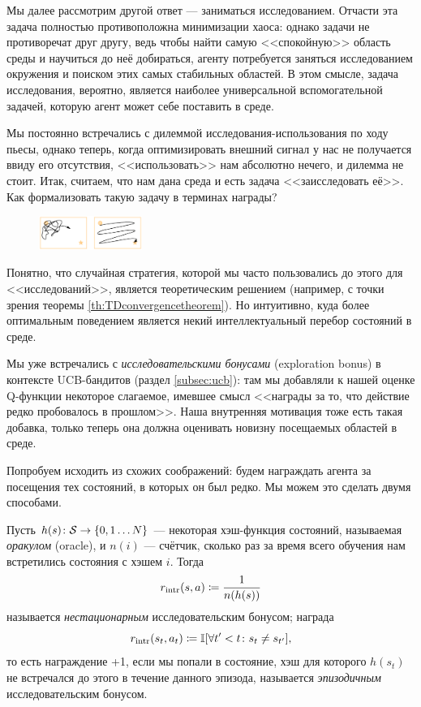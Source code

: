 Мы далее рассмотрим другой ответ --- заниматься исследованием. Отчасти эта задача полностью противоположна минимизации хаоса: однако задачи не противоречат друг другу, ведь чтобы найти самую <<спокойную>> область среды и научиться до неё добираться, агенту потребуется заняться исследованием окружения и поиском этих самых стабильных областей. В этом смысле, задача исследования, вероятно, является наиболее универсальной вспомогательной задачей, которую агент может себе поставить в среде.

Мы постоянно встречались с дилеммой исследования-использования по ходу пьесы, однако теперь, когда оптимизировать внешний сигнал у нас не получается ввиду его отсутствия, <<использовать>> нам абсолютно нечего, и дилемма не стоит. Итак, считаем, что нам дана среда и есть задача <<заисследовать её>>. Как формализовать такую задачу в терминах награды?

\begin{figure}
\vspace{-0.4cm}
\centering
\includegraphics[width=0.3\textwidth]{Images/exploration.png}
\vspace{-0.5cm}
\end{figure}

Понятно, что случайная стратегия, которой мы часто пользовались до этого для <<исследований>>, является теоретическим решением (например, с точки зрения теоремы \ref{th:TDconvergencetheorem}). Но интуитивно, куда более оптимальным поведением является некий интеллектуальный перебор состояний в среде.

Мы уже встречались с \emph{исследовательскими бонусами} (exploration bonus) в контексте UCB-бандитов (раздел \ref{subsec:ucb}): там мы добавляли к нашей оценке Q-функции некоторое слагаемое, имевшее смысл <<награды за то, что действие редко пробовалось в прошлом>>. Наша внутренняя мотивация тоже есть такая добавка, только теперь она должна оценивать новизну посещаемых областей в среде.

Попробуем исходить из схожих соображений: будем награждать агента за посещения тех состояний, в которых он был редко. Мы можем это сделать двумя способами.

\begin{definition}
Пусть $h(s) \colon \mathcal{S} \to \{0, 1 \dots N\}$ --- некоторая хэш-функция состояний, называемая \emph{оракулом} (oracle), и $n(i)$ --- счётчик, сколько раз за время всего обучения нам встретились состояния с хэшем $i$. Тогда
$$r_{\mathrm{intr}}(s, a) \coloneqq \frac{1}{n(h(s))}$$
называется \emph{нестационарным} исследовательским бонусом; награда
$$r_{\mathrm{intr}}(s_t, a_t) \coloneqq \mathbb{I}[\forall t' < t \colon s_t \neq s_{t'}],$$
то есть награждение +1, если мы попали в состояние, хэш для которого $h(s_t)$ не встречался до этого в течение данного эпизода, называется \emph{эпизодичным} исследовательским бонусом.
\end{definition}

